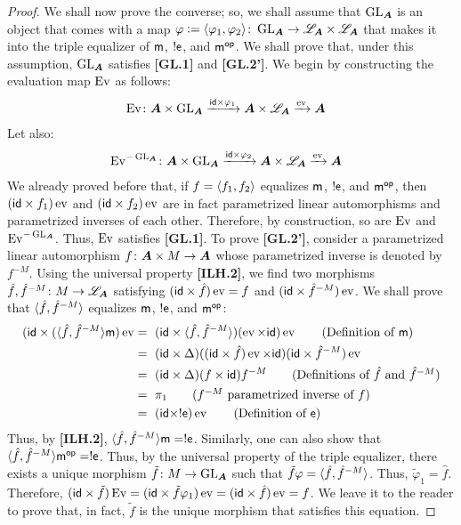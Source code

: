 \begin{proof}
We shall now prove the converse; so, we shall assume that $\operatorname{GL}_{\bm{A}}$ is an object that comes with a map $\varphi\mathrel{\mathop:}=\langle\varphi_1,\varphi_2\rangle\colon\operatorname{GL}_{\bm{A}}\to\mathscr{L}_{\bm{A}}\times\mathscr{L}_{\bm{A}}$ that makes it into the triple equalizer of $\mathsf{m}$, $!\mathsf{e}$, and $\mathsf{m}^{\mathsf{op}}$. We shall prove that, under this assumption, $\operatorname{GL}_{\bm{A}}$ satisfies \textbf{[GL.1]} and \textbf{[GL.2']}. We begin by constructing the evaluation map $\operatorname{Ev}$ as follows:
\begin{align*}
&\operatorname{Ev}\colon{\bm{A}}\times\operatorname{GL}_{\bm{A}}\xrightarrow{\mathsf{id}\times\varphi_1}{\bm{A}}\times\mathscr{L}_{\bm{A}}\xrightarrow{\operatorname{ev}}{\bm{A}}
\end{align*}
Let also:
\begin{align*}
&\operatorname{Ev}^{-\operatorname{GL}_{\bm{A}}}\colon{\bm{A}}\times\operatorname{GL}_{\bm{A}}\xrightarrow{\mathsf{id}\times\varphi_2}{\bm{A}}\times\mathscr{L}_{\bm{A}}\xrightarrow{\operatorname{ev}}{\bm{A}}
\end{align*}
We already proved before that, if $f=\langle f_1,f_2\rangle$ equalizes $\mathsf{m}$, $!\mathsf{e}$, and $\mathsf{m}^{\mathsf{op}}$, then $(\mathsf{id}\times f_1)\operatorname{ev}$ and $(\mathsf{id}\times f_2)\operatorname{ev}$ are in fact parametrized linear automorphisms and parametrized inverses of each other. Therefore, by construction, so are $\operatorname{Ev}$ and $\operatorname{Ev}^{-\operatorname{GL}_{\bm{A}}}$. Thus, $\operatorname{Ev}$ satisfies \textbf{[GL.1]}. To prove \textbf{[GL.2']}, consider a parametrized linear automorphism $f\colon{\bm{A}}\times M\to{\bm{A}}$ whose parametrized inverse is denoted by $f^{-M}$. Using the universal property \textbf{[ILH.2]}, we find two morphisms $\hat f,\hat f^{-M}\colon M\to\mathscr{L}_{\bm{A}}$ satisfying $(\mathsf{id}\times\hat f)\operatorname{ev}=f$ and $(\mathsf{id}\times\hat f^{-M})\operatorname{ev}$. We shall prove that $\langle\hat f,\hat f^{-M}\rangle$ equalizes $\mathsf{m}$, $!\mathsf{e}$, and $\mathsf{m}^{\mathsf{op}}$:
\begin{align*}
(\id\times(\<\hat f,\hat f^{-M}\>\m)\ev&=~(\id\times\<\hat f,\hat f^{-M}\>)(\ev\times\id)\ev    \tag{Definition of $\m$}\\
&=~(\id\times\Delta)((\id\times\hat f)\ev\times\id)(\id\times\hat f^{-M})\ev\\
&=~(\id\times\Delta)(f\times\id)f^{-M}              \tag{Definitions of $\hat f$ and $\hat f^{-M}$}\\
&=~\pi_1                                            \tag{$f^{-M}$ parametrized inverse of $f$}\\
&=~(\id\times!\e)\ev                                \tag{Definition of $\e$}
\end{align*}
Thus, by \textbf{[ILH.2]}, $\langle\hat f,\hat f^{-M}\rangle\mathsf{m}=!\mathsf{e}$. Similarly, one can also show that $\langle\hat f,\hat f^{-M}\rangle\mathsf{m}^{\mathsf{op}}=!\mathsf{e}$. Thus, by the universal property of the triple equalizer, there exists a unique morphism $\tilde f\colon M\to\operatorname{GL}_{\bm{A}}$ such that $\tilde f\varphi=\langle\hat f,\hat f^{-M}\rangle$. Thus, $\tilde\varphi_1=\hat f$. Therefore, $(\mathsf{id}\times\tilde f)\operatorname{Ev}=(\mathsf{id}\times\tilde f\varphi_1)\operatorname{ev}=(\mathsf{id}\times\hat f)\operatorname{ev}=f$. We leave it to the reader to prove that, in fact, $\tilde f$ is the unique morphism that satisfies this equation.


\end{proof}
